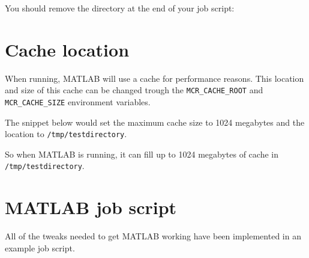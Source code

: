You should remove the directory at the end of your job script:
\begin{prompt}
\end{prompt}

\section{Cache location}

When running, MATLAB will use a cache for performance reasons. This location
and size of this cache can be changed trough the \verb|MCR_CACHE_ROOT| and
\verb|MCR_CACHE_SIZE| environment variables.

The snippet below would set the maximum cache size to 1024 megabytes and the
location to \verb|/tmp/testdirectory|.

\begin{prompt}
\end{prompt}

So when MATLAB is running, it can fill up to 1024 megabytes of cache in
\verb|/tmp/testdirectory|.

\section{MATLAB job script}

All of the tweaks needed to get MATLAB working have been implemented in an example
job script.

